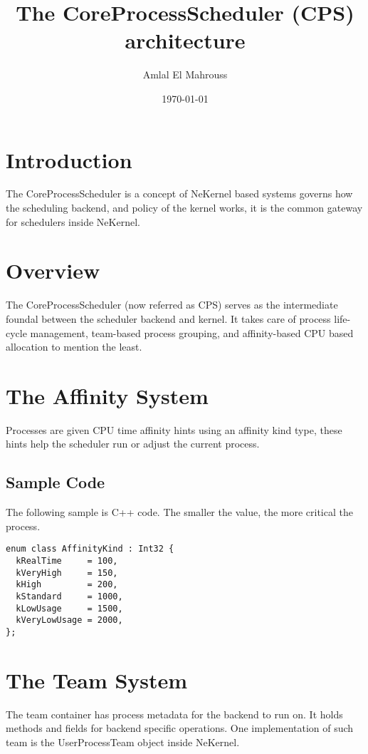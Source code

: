\documentclass{article}
\title{The CoreProcessScheduler (CPS) architecture}
\author{Amlal El Mahrouss}
\date{\today}
\begin{document}
\maketitle

\section{Introduction}

{The CoreProcessScheduler is a concept of NeKernel based systems governs how the scheduling backend, and policy of the kernel works, it is the common gateway for schedulers inside NeKernel.}

\section{Overview}

{The CoreProcessScheduler (now referred as CPS) serves as the intermediate foundal between the scheduler backend and kernel.} {It takes care of process life-cycle management, team-based process grouping, and affinity-based CPU based allocation to mention the least.}

\section{The Affinity System}

{Processes are given CPU time affinity hints using an affinity kind type, these hints help the scheduler run or adjust the current process.}

\subsection{Sample Code}

{The following sample is C++ code.} {The smaller the value, the more critical the process.}

\begin{verbatim}
enum class AffinityKind : Int32 {
  kRealTime     = 100,
  kVeryHigh     = 150,
  kHigh         = 200,
  kStandard     = 1000,
  kLowUsage     = 1500,
  kVeryLowUsage = 2000,
};
\end{verbatim}

\section{The Team System}

{The team container has process metadata for the backend to run on. It holds methods and fields for backend specific operations.} {One implementation of such team is the UserProcessTeam object inside NeKernel.}
\end{document}
